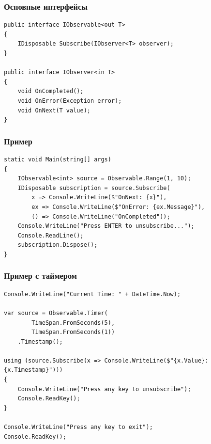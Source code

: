 \documentclass[xetex,mathserif,serif]{beamer}
\begin{document}
	\begin{frame}[fragile]
		\frametitle{Основные интерфейсы}
		\begin{verbatim}
public interface IObservable<out T> 
{
    IDisposable Subscribe(IObserver<T> observer); 
}

public interface IObserver<in T> 
{ 
    void OnCompleted();
    void OnError(Exception error);
    void OnNext(T value);
} 
		\end{verbatim}
	\end{frame}

	\begin{frame}[fragile]
		\frametitle{Пример}
		\begin{verbatim}
static void Main(string[] args)
{
    IObservable<int> source = Observable.Range(1, 10);
    IDisposable subscription = source.Subscribe(
        x => Console.WriteLine($"OnNext: {x}"),
        ex => Console.WriteLine($"OnError: {ex.Message}"),
        () => Console.WriteLine("OnCompleted"));
    Console.WriteLine("Press ENTER to unsubscribe...");
    Console.ReadLine();
    subscription.Dispose();
}
		\end{verbatim}
	\end{frame}

	\begin{frame}[fragile]
		\frametitle{Пример с таймером}
		\begin{small}
			\begin{verbatim}
Console.WriteLine("Current Time: " + DateTime.Now);

var source = Observable.Timer(
        TimeSpan.FromSeconds(5), 
        TimeSpan.FromSeconds(1))
    .Timestamp();

using (source.Subscribe(x => Console.WriteLine($"{x.Value}: {x.Timestamp}")))
{
    Console.WriteLine("Press any key to unsubscribe");
    Console.ReadKey();
}

Console.WriteLine("Press any key to exit");
Console.ReadKey();
			\end{verbatim}
		\end{small}
	\end{frame}
\end{document}
